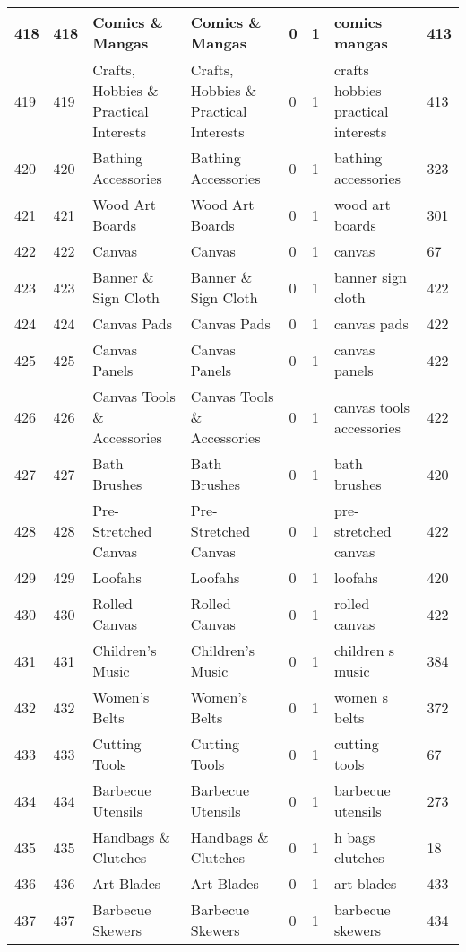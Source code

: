 \begin{longtable}{|l|l|l|l|l|l|l|l|}
418 & 418 & Comics \& Mangas & Comics \& Mangas & 0 & 1 & comics mangas & 413 \\ \hline 
419 & 419 & Crafts, Hobbies \& Practical Interests & Crafts, Hobbies \& Practical Interests & 0 & 1 & crafts hobbies practical interests & 413 \\ \hline 
420 & 420 & Bathing Accessories & Bathing Accessories & 0 & 1 & bathing accessories & 323 \\ \hline 
421 & 421 & Wood Art Boards & Wood Art Boards & 0 & 1 & wood art boards & 301 \\ \hline 
422 & 422 & Canvas & Canvas & 0 & 1 & canvas & 67 \\ \hline 
423 & 423 & Banner \& Sign Cloth & Banner \& Sign Cloth & 0 & 1 & banner sign cloth & 422 \\ \hline 
424 & 424 & Canvas Pads & Canvas Pads & 0 & 1 & canvas pads & 422 \\ \hline 
425 & 425 & Canvas Panels & Canvas Panels & 0 & 1 & canvas panels & 422 \\ \hline 
426 & 426 & Canvas Tools \& Accessories & Canvas Tools \& Accessories & 0 & 1 & canvas tools accessories & 422 \\ \hline 
427 & 427 & Bath Brushes & Bath Brushes & 0 & 1 & bath brushes & 420 \\ \hline 
428 & 428 & Pre-Stretched Canvas & Pre-Stretched Canvas & 0 & 1 & pre-stretched canvas & 422 \\ \hline 
429 & 429 & Loofahs & Loofahs & 0 & 1 & loofahs & 420 \\ \hline 
430 & 430 & Rolled Canvas & Rolled Canvas & 0 & 1 & rolled canvas & 422 \\ \hline 
431 & 431 & Children's Music & Children's Music & 0 & 1 & children s music & 384 \\ \hline 
432 & 432 & Women's Belts & Women's Belts & 0 & 1 & women s belts & 372 \\ \hline 
433 & 433 & Cutting Tools & Cutting Tools & 0 & 1 & cutting tools & 67 \\ \hline 
434 & 434 & Barbecue Utensils & Barbecue Utensils & 0 & 1 & barbecue utensils & 273 \\ \hline 
435 & 435 & Handbags \& Clutches & Handbags \& Clutches & 0 & 1 & h bags clutches & 18 \\ \hline 
436 & 436 & Art Blades & Art Blades & 0 & 1 & art blades & 433 \\ \hline 
437 & 437 & Barbecue Skewers & Barbecue Skewers & 0 & 1 & barbecue skewers & 434 \\ \hline 

\end{longtable}
